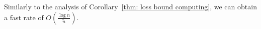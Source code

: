 \documentclass{article}
\def\leqone{\overset{\text{\ding{172}}}{\leq}}
\def\leqtwo{\overset{\text{\ding{173}}}{\leq}}
\DeclareMathOperator*{\argmin}{argmin}
\begin{document}
Similarly to the analysis of Corollary~\ref{thm: loss bound computing}, we can obtain a fast rate of $O(\frac{\log \tilde{n}}{\tilde{n}})$. 
\end{document}
